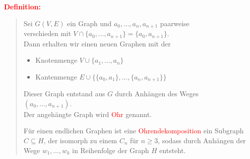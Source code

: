 \documentclass{article}
\newcommand{\red}[1]{\textcolor{red}{#1}}
\newcommand{\de}[1]{\red{\textbf{Definition: }}\begin{quote}#1\end{quote}}
\begin{document}
\de{
    Sei $G(V,E)$ ein Graph und $a_0, \dots, a_n, a_{n+1}$ paarweise\\
    verschieden mit $V \cap \{a_0, \dots, a_{n+1}\} = \{a_0, a_{n+1}\}$.\\
    Dann erhalten wir einen neuen Graphen mit der \begin{itemize}
        \item Knotenmenge $V \cup \{a_1, \dots, a_n\}$
        \item Kantenmenge $E \cup \{\{a_0, a_1\}, \dots, \{a_n, a_{n+1}\}\}$
    \end{itemize}
    Dieser Graph entstand aus $G$ durch Anhängen des Weges \\$(a_0, \dots, a_{n+1})$.\\
    Der angehängte Graph wird \red{Ohr} genannt.

    Für einen endlichen Graphen ist eine \red{Ohrendekomposition} ein Subgraph $C \subseteq H$, der isomorph zu einem $C_n$ für $n \ge 3$, sodass durch Anhängen der Wege $w_1, \dots, w_k$ in Reihenfolge der Graph $H$ entsteht.
}
\end{document}
